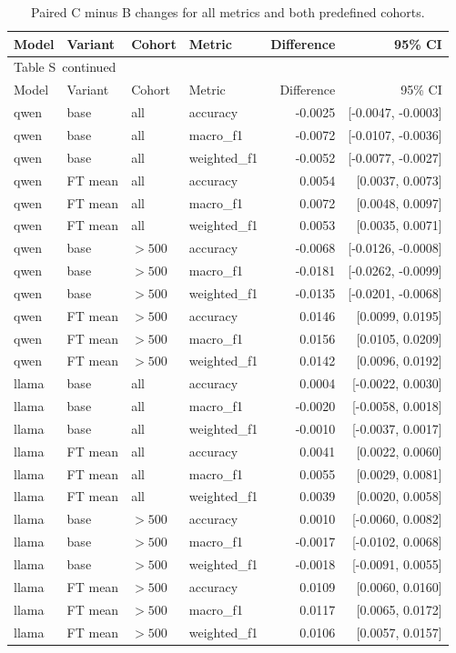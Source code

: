 \documentclass[10pt,a4paper]{article}
\renewcommand{\thetable}{S\arabic{table}}
\begin{document}
{\footnotesize
\setlength{\tabcolsep}{4pt}
\begin{longtable}{@{}llllrr@{}}
\caption{Paired C minus B changes for all metrics and both predefined cohorts.}\label{sup:length-effects}\\
\toprule
Model & Variant & Cohort & Metric & Difference & 95\% CI \\
\midrule\endfirsthead
\multicolumn{6}{l}{\small Table \thetable\ continued}\\
\toprule
Model & Variant & Cohort & Metric & Difference & 95\% CI \\
\midrule\endhead
\bottomrule\endfoot
qwen & base & all & accuracy & -0.0025 & [-0.0047, -0.0003] \\
qwen & base & all & macro\_f1 & -0.0072 & [-0.0107, -0.0036] \\
qwen & base & all & weighted\_f1 & -0.0052 & [-0.0077, -0.0027] \\
qwen & FT mean & all & accuracy & 0.0054 & [0.0037, 0.0073] \\
qwen & FT mean & all & macro\_f1 & 0.0072 & [0.0048, 0.0097] \\
qwen & FT mean & all & weighted\_f1 & 0.0053 & [0.0035, 0.0071] \\
qwen & base & $>500$ & accuracy & -0.0068 & [-0.0126, -0.0008] \\
qwen & base & $>500$ & macro\_f1 & -0.0181 & [-0.0262, -0.0099] \\
qwen & base & $>500$ & weighted\_f1 & -0.0135 & [-0.0201, -0.0068] \\
qwen & FT mean & $>500$ & accuracy & 0.0146 & [0.0099, 0.0195] \\
qwen & FT mean & $>500$ & macro\_f1 & 0.0156 & [0.0105, 0.0209] \\
qwen & FT mean & $>500$ & weighted\_f1 & 0.0142 & [0.0096, 0.0192] \\
llama & base & all & accuracy & 0.0004 & [-0.0022, 0.0030] \\
llama & base & all & macro\_f1 & -0.0020 & [-0.0058, 0.0018] \\
llama & base & all & weighted\_f1 & -0.0010 & [-0.0037, 0.0017] \\
llama & FT mean & all & accuracy & 0.0041 & [0.0022, 0.0060] \\
llama & FT mean & all & macro\_f1 & 0.0055 & [0.0029, 0.0081] \\
llama & FT mean & all & weighted\_f1 & 0.0039 & [0.0020, 0.0058] \\
llama & base & $>500$ & accuracy & 0.0010 & [-0.0060, 0.0082] \\
llama & base & $>500$ & macro\_f1 & -0.0017 & [-0.0102, 0.0068] \\
llama & base & $>500$ & weighted\_f1 & -0.0018 & [-0.0091, 0.0055] \\
llama & FT mean & $>500$ & accuracy & 0.0109 & [0.0060, 0.0160] \\
llama & FT mean & $>500$ & macro\_f1 & 0.0117 & [0.0065, 0.0172] \\
llama & FT mean & $>500$ & weighted\_f1 & 0.0106 & [0.0057, 0.0157] \\
\end{longtable}
}
\end{document}
